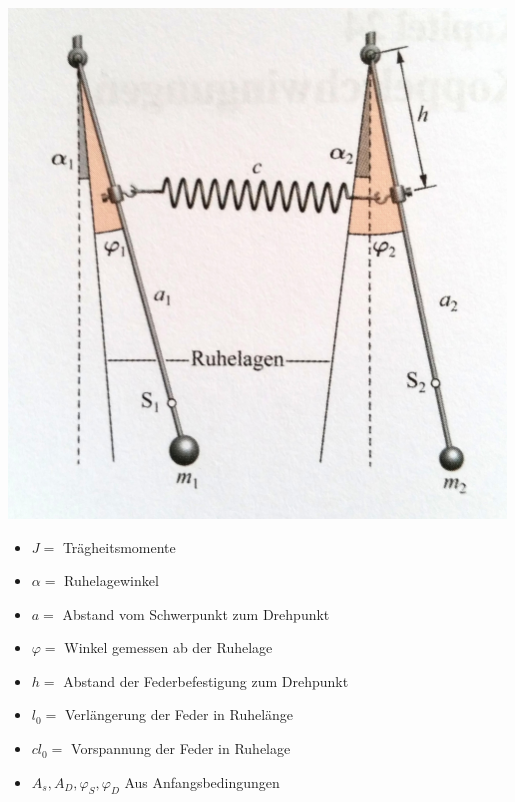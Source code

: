 \begin{minipage}{0.29\textwidth}
\includegraphics[width = 0.99\textwidth]{bilder/kopppendel.jpg}
\begin{itemize}
\itemsep0em
\item $J =$ Trägheitsmomente
\item $\alpha =$ Ruhelagewinkel
\item $a = $ Abstand vom Schwerpunkt zum Drehpunkt
\item $\varphi = $ Winkel gemessen ab der Ruhelage
\item $h = $ Abstand der Federbefestigung zum Drehpunkt
\item $l_0 =$ Verlängerung der Feder in Ruhelänge
\item $cl_0 = $ Vorspannung der Feder in Ruhelage
\item $A_s, A_D, \varphi_S, \varphi_D$ Aus Anfangsbedingungen
\end{itemize}
\end{minipage}
